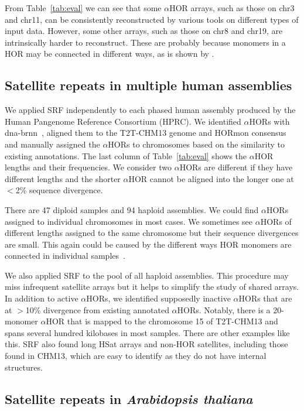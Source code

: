 \documentclass{bioinfo}
\begin{document}
From Table~\ref{tab:eval} we can see that some $\alpha$HOR arrays, such as
those on chr3 and chr11, can be consistently reconstructed by various tools on
different types of input data. However, some other arrays, such as those on
chr8 and chr19, are intrinsically harder to reconstruct. These are probably
because monomers in a HOR may be connected in different ways, as is shown by
\citet{Kunyavskaya:2022tx}.

\subsection{Satellite repeats in multiple human assemblies}

We applied SRF independently to each phased human assembly produced by the
Human Pangenome Reference Consortium (HPRC). We identified $\alpha$HORs
with dna-brnn~\citep{Li:2019aa}, aligned them to the T2T-CHM13 genome and
HORmon consensus and manually assigned the $\alpha$HORs to chromosomes based on
the similarity to existing annotations. The last column of Table~\ref{tab:eval}
shows the $\alpha$HOR lengths and their frequencies. We consider two
$\alpha$HORs are different if they have different lengths and the shorter
$\alpha$HOR cannot be aligned into the longer one at $<$2\% sequence
divergence.

There are 47 diploid samples and 94 haploid assemblies. We could find
$\alpha$HORs assigned to individual chromosomes in most cases. We sometimes see
$\alpha$HORs of different lengths assigned to the same chromosome but their
sequence divergences are small. This again could be caused by the different
ways HOR monomers are connected in individual
samples~\citep{Logsdon:2021aa,Kunyavskaya:2022tx}.

We also applied SRF to the pool of all haploid assemblies. This procedure
may miss infrequent satellite arrays but it helps to simplify the study of
shared arrays. In addition to active $\alpha$HORs, we identified supposedly
inactive $\alpha$HORs that are at $>$10\% divergence from existing annotated
$\alpha$HORs. Notably, there is a 20-monomer $\alpha$HOR that is mapped to
the chromosome 15 of T2T-CHM13 and spans several hundred kilobases in most
samples. There are other examples like this. SRF also found long HSat
arrays and non-HOR satellites, including those found in CHM13, which are easy
to identify as they do not have internal structures.

\subsection{Satellite repeats in \emph{Arabidopsis thaliana}}
\end{document}
